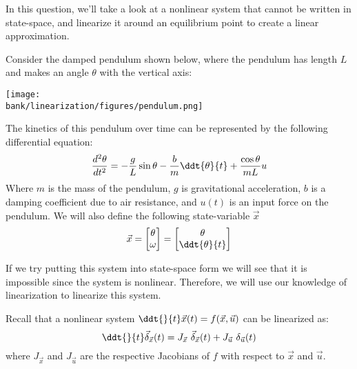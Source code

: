 
In this question, we'll take a look at a nonlinear system that cannot be written in state-space, and linearize it around an equilibrium point to create a linear approximation.

Consider the damped pendulum shown below, where the pendulum has length $L$ and makes an angle $\theta$ with the vertical axis:
\begin{center}
\texttt{[image: \\bank/linearization/figures/pendulum.png]}
\end{center}
The kinetics of this pendulum over time can be represented by the following differential equation:
\begin{equation}
  \frac{d^{2} \theta}{dt^{2}} = -\frac{g}{L} \sin \theta - \frac{b}{m} \ddt{\theta}{t} + \frac{\cos \theta}{mL} u
\end{equation}
Where $m$ is the mass of the pendulum, $g$ is gravitational acceleration, $b$ is a damping coefficient due to air resistance, and $u(t)$ is an input force on the pendulum. We will also define the following state-variable $\vec{x}$ 
\begin{equation*}
  \vec{x} = \begin{bmatrix} \theta \\ \omega \end{bmatrix} = \begin{bmatrix} \theta \\ \ddt{\theta}{t} \end{bmatrix}
\end{equation*}

If we try putting this system into state-space form we will see that it is impossible since the system is nonlinear.
Therefore, we will use our knowledge of linearization to linearize this system.

Recall that a nonlinear system $\ddt{}{t} \vec{x}(t) = f(\vec{x}, \vec{u})$ can be linearized as:
\begin{equation}
  \ddt{}{t} \vec{\delta}_{\vec{x}}(t) = J_{\vec{x}} \ \vec{\delta}_{\vec{x}}(t) + J_{\vec{u}} \ \delta_{\vec{u}}(t)
\end{equation}
where $J_{\vec{x}}$ and $J_{\vec{u}}$ are the respective Jacobians of $f$ with respect to $\vec{x}$ and $\vec{u}.$

